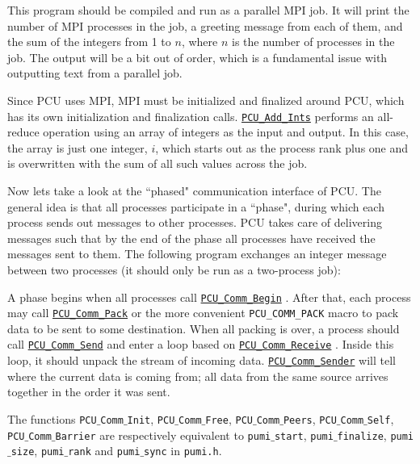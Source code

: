 \documentclass{article}
\begin{document}
This program should be compiled and run as a parallel MPI job.
It will print the number of MPI processes in the job, a greeting
message from each of them, and the sum of the integers from 1 to $n$,
where $n$ is the number of processes in the job.
The output will be a bit out of order, which is a fundamental issue
with outputting text from a parallel job.

Since PCU uses MPI, MPI must be initialized and finalized around
PCU, which has its own initialization and finalization calls.
\href{http://scorec.rpi.edu/~dibanez/core/pcu_8c.html#abf86ddf22cc114fd2bd3f054a067c225}{\texttt{PCU\_Add\_Ints}}
performs an all-reduce operation using
an array of integers as the input and output.
In this case, the array is just one integer, $i$, which starts
out as the process rank plus one and is overwritten with the sum
of all such values across the job.

Now lets take a look at the ``phased" communication interface of PCU.
The general idea is that all processes participate in a ``phase",
during which each process sends out messages to other processes.
PCU takes care of delivering messages such that by the end of
the phase all processes have received the messages sent to them.
The following program exchanges an integer message between two
processes (it should only be run as a two-process job):



A phase begins when all processes call
\href{http://scorec.rpi.edu/~dibanez/core/pcu_8c.html#aa1821bf79d880c38cdd91515751799ac}{\texttt{PCU\_Comm\_Begin}}
.
After that, each process may call
\href{http://scorec.rpi.edu/~dibanez/core/pcu_8c.html#afd8a6600d960129089c45fd49c1b2311}{\texttt{PCU\_Comm\_Pack}}
or the more convenient
\texttt{PCU\_COMM\_PACK}
macro to pack data to be sent to some destination.
When all packing is over, a process should call
\href{http://scorec.rpi.edu/~dibanez/core/pcu_8c.html#a263061f00174fc7a004dcb198778006c}{\texttt{PCU\_Comm\_Send}}
and enter a loop based on
\href{http://scorec.rpi.edu/~dibanez/core/pcu_8c.html#ad02bc960bcfa8e2d6b09458dca38bf53}{\texttt{PCU\_Comm\_Receive}}
.
Inside this loop, it should unpack the stream of incoming data.
\href{http://scorec.rpi.edu/~dibanez/core/pcu_8c.html#ac4577ded2ec61de4b4141e3353aac440}{\texttt{PCU\_Comm\_Sender}}
will tell where the current data is coming
from; all data from the same source arrives together in the
order it was sent.

The functions \texttt{PCU$\_$Comm$\_$Init}, \texttt{PCU$\_$Comm$\_$Free},
\texttt{PCU$\_$Comm$\_$Peers}, \texttt{PCU$\_$Comm$\_$Self}, \texttt{PCU$\_$Comm$\_$Barrier} are respectively
equivalent to \texttt{pumi$\_$start}, \texttt{pumi$\_$finalize},
\texttt{pumi$\_$size}, \texttt{pumi$\_$rank} and \texttt{pumi$\_$sync} in \texttt{pumi.h}.
\end{document}
